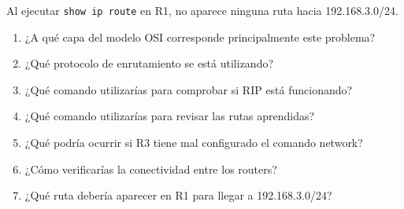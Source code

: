 \begin{tcolorbox}[enunciado]
Al ejecutar \texttt{show ip route} en R1, no aparece ninguna ruta hacia 192.168.3.0/24.

\begin{enumerate}[label=\arabic*., leftmargin=*]
    \item ¿A qué capa del modelo OSI corresponde principalmente este problema?
    \item ¿Qué protocolo de enrutamiento se está utilizando?
    \item ¿Qué comando utilizarías para comprobar si RIP está funcionando?
    \item ¿Qué comando utilizarías para revisar las rutas aprendidas?
    \item ¿Qué podría ocurrir si R3 tiene mal configurado el comando network?
    \item ¿Cómo verificarías la conectividad entre los routers?
    \item ¿Qué ruta debería aparecer en R1 para llegar a 192.168.3.0/24?
\end{enumerate}
\end{tcolorbox}

